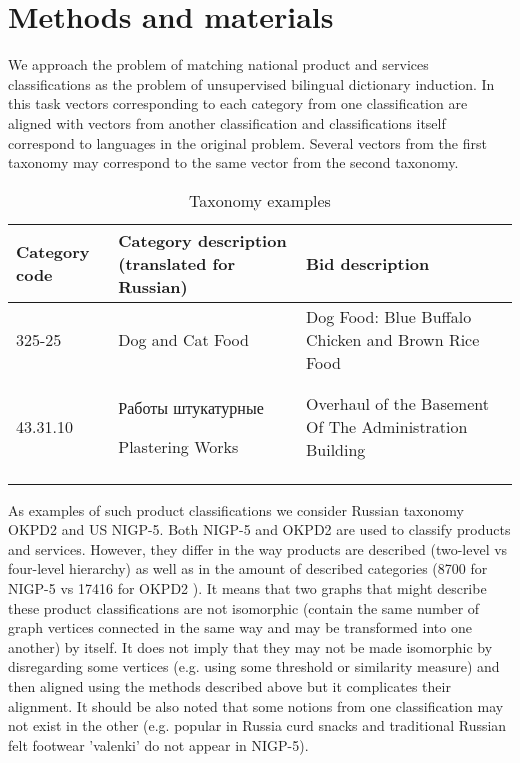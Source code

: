 \documentclass[conference]{IEEEtran}
\begin{document}
\section{Methods and materials}

We approach the problem of matching national product and services classifications as the problem of unsupervised bilingual dictionary induction. In this task vectors corresponding to each category from one classification are aligned with vectors from another classification and classifications itself correspond to languages in the original problem. Several vectors from the first taxonomy may correspond to the same vector from the second taxonomy.

\begin{center}
\begin{table}[!htbp]
\caption{Taxonomy examples}
\begin{tabular}{p{1.5cm}|p{3cm}|p{3cm}}
  Category code & Category description \newline (translated for Russian) & Bid description\\
  \hline
  \hline
 325-25 & Dog and Cat Food & Dog Food: Blue Buffalo Chicken and Brown Rice Food\\
  43.31.10 & \begin{russian}Работы штукатурные\end{russian} \newline Plastering Works & Overhaul of the Basement Of The Administration Building\\
\label{table-taxonomies}
\end{tabular}
\end{table}
\end{center}

As examples of such product classifications we consider Russian taxonomy OKPD2 and US NIGP-5.
Both NIGP-5 and OKPD2 are used to classify products and services. However, they differ in the way products are described (two-level vs four-level hierarchy) as well as in the amount of described categories (8700 for NIGP-5 \cite{wiki-nigp} vs 17416 for OKPD2 \cite{wiki-okpd}). It means that two graphs that might describe these product classifications are not isomorphic (contain the same number of graph vertices connected in the same way and may be transformed into one another) by itself.  It does not imply that they may not be made isomorphic by disregarding some vertices (e.g. using some threshold or similarity measure) and then aligned using the methods described above but it complicates their alignment. It should be also noted that some notions from one classification may not exist in the other (e.g. popular in Russia curd snacks and traditional Russian felt footwear 'valenki' do not appear in NIGP-5).
\end{document}
